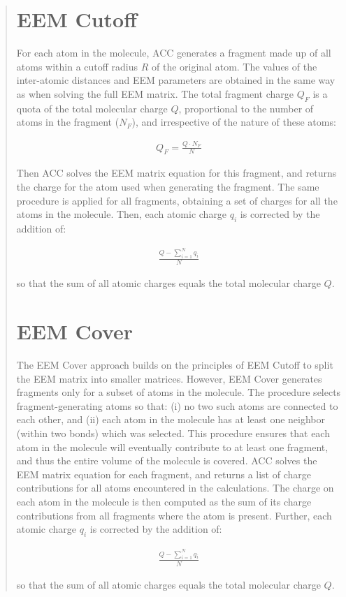 \documentclass[oneside]{memoir}
\begin{document}
\begin{quote}

\section*{EEM Cutoff}
For each atom in the molecule, ACC generates a fragment made up of all atoms within a cutoff
radius $R$ of the original atom. The values of the inter-atomic distances and EEM parameters are
obtained in the same way as when solving the full EEM matrix. The total fragment charge $Q_F$
is a quota of the total molecular charge $Q$, proportional to the number of atoms in the fragment
($N_F$), and irrespective of the nature of these atoms:

\begin{align*}
Q_F = \frac{Q\cdot N_F}{N}
\end{align*}

Then ACC solves the EEM matrix equation for this fragment, and returns the charge for the
atom used when generating the fragment. The same procedure is applied for all fragments,
obtaining a set of charges for all the atoms in the molecule. Then, each atomic charge $q_i$
is corrected by the addition of:

\begin{align*}
\frac{Q - \sum_{i = 1}^N q_i}{N}
\end{align*}

so that the sum of all atomic charges equals the total molecular charge $Q$.

\section*{EEM Cover}
The EEM Cover approach builds on the principles of EEM Cutoff to split the EEM matrix into
smaller matrices. However, EEM Cover generates fragments only for a subset of atoms in the
molecule. The procedure selects fragment-generating atoms so that: (i) no two such atoms are
connected to each other, and (ii) each atom in the molecule has at least one neighbor (within
two bonds) which was selected. This procedure ensures that each atom in the molecule will
eventually contribute to at least one fragment, and thus the entire volume of the molecule is
covered. ACC solves the EEM matrix equation for each fragment, and returns a list of charge
contributions for all atoms encountered in the calculations. The charge on each atom in the
molecule is then computed as the sum of its charge contributions from all fragments where the
atom is present. Further, each atomic charge $q_i$ is corrected by the addition of:


\begin{align*}
\frac{Q - \sum_{i = 1}^N q_i}{N}
\end{align*}

so that the sum of all atomic charges equals the total molecular charge $Q$.

\end{quote}
\end{document}
